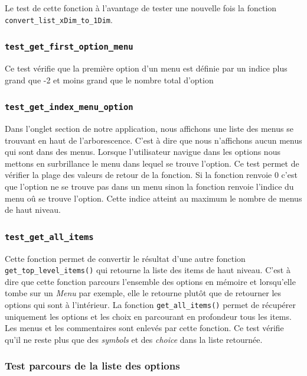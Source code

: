\documentclass[17pts]{report}
\begin{document}
Le test de cette fonction à l'avantage de tester une nouvelle fois la fonction
\verb|convert_list_xDim_to_1Dim|.

\subsubsection{\texttt{test\_get\_first\_option\_menu}}

Ce test vérifie que la première option d'un menu est définie par un indice
plus grand que -2 et moins grand que le nombre total d'option

\subsubsection{\texttt{test\_get\_index\_menu\_option}}

Dans l'onglet section de notre application, nous affichons une liste des menus
se trouvant en haut de l'arborescence. C'est à dire que nous n'affichons aucun
menus qui sont dans des menus. Lorsque l'utilisateur navigue dans les options
nous mettons en surbrillance le menu dans lequel se trouve l'option.  Ce test
permet de vérifier la plage des valeurs de retour de la fonction.  Si la
fonction renvoie 0 c'est que l'option ne se trouve pas dans un menu sinon la
fonction renvoie l'indice du menu oû se trouve l'option. Cette indice atteint
au maximum le nombre de menus de haut niveau.

\subsubsection{\texttt{test\_get\_all\_items}}

Cette fonction permet de convertir le résultat d'une autre fonction
\verb|get_top_level_items()| qui retourne la liste des items de haut niveau.
C'est à dire que cette fonction parcours l'ensemble des options en mémoire et
lorsqu'elle tombe sur un \textit{Menu} par exemple, elle le retourne plutôt que
de retourner les options qui sont à l'intérieur. La fonction
\verb|get_all_items()| permet de récupérer uniquement les options et les choix
en parcourant en profondeur tous les items. Les menus et les commentaires sont
enlevés par cette fonction. Ce test vérifie qu'il ne reste plus que des
\textit{symbols} et des \textit{choice} dans la liste retournée.

\subsubsection{Test parcours de la liste des options}
\end{document}
